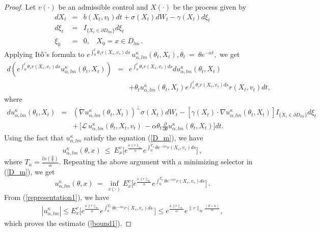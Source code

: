 \documentclass[11pt]{amsart}
\numberwithin{equation}{section}
\begin{document}
\begin{proof}
Let  $v(\cdot)$ be an admissible control and  $X(\cdot)$ be the process given by
 \[
 \begin{array}{rcl}
 \displaystyle{
  dX_t} &=& \displaystyle{ b(X_t,v_t)dt+\sigma(X_t) dW_t - \gamma(X_t)d\xi_t } \\
 \displaystyle{ d\xi_t }&=&  \displaystyle{  I_{\{X_t\in \partial D_{lm}\}} d\xi_t  } \\
 \displaystyle{ \xi_0 } &=& \displaystyle{  0,\ \ \ \ X_0 = x\in \overline{D}_{lm}\, . } 
 \end{array}
 \]
  Applying It$\hat{{\rm o}}$'s formula to $\displaystyle {
 e^{\int_{0}^{t} \theta_s r(X_s,v_s) ds} \, u^{\kappa}_{\alpha,lm}(\theta_t , X_t) }, \theta_t \ = \ 
 \theta e^{-\alpha t},$ we get
 \begin{eqnarray*}
  d\left( e^{\int_{0}^{t} \theta_s r(X_s,v_s) ds} u^{\kappa}_{\alpha,lm}(\theta_t , X_t)\right) &=& 
  e^{\int_{0}^{t} \theta_s r(X_s,v_s) ds} du^{\kappa}_{\alpha,lm}(\theta_t , X_t) \\
 &&+  \theta_t u^{\kappa}_{\alpha,lm}(\theta_t , X_t) e^{\int_{0}^{t} \theta_s r(X_s,v_s) ds} r(X_t,v_t) dt,
 \end{eqnarray*}
 where
 \begin{eqnarray*}
 du^{\kappa}_{\alpha,lm}(\theta_t , X_t) &=&  (\nabla u^{\kappa}_{\alpha,lm}(\theta_t, X_t))^\bot 
 \sigma(X_t) dW_t - \left[\gamma(X_t)\cdot \nabla u^{\kappa}_{\alpha,lm}
 (\theta_t, X_t)\right] I_{\{X_t\in\partial D_{lm}\}} d\xi_t \\ 
 && + \,  \Big[ {\mathcal L} \, u^{\kappa}_{\alpha, lm} (\theta_t, X_t, v_t) \, 
 - \alpha \theta_t \frac{\partial}{\partial \theta} u^{\kappa}_{\alpha,lm}(\theta_t , X_t) \Big] dt .
 \end{eqnarray*}
 Using the fact that $u^{\kappa}_{\alpha,lm}$ satisfy the equation (\ref{D_m}), we have 
 \[
  u^{\kappa}_{\alpha,lm}(\theta, x) \ \leq \ 
 E_x^v\Big[ e^{\frac{\kappa \|r\|_{\infty}}{\alpha}}
 e^{\int_{0}^{T_{\kappa}} \theta e^{-\alpha s} r(X_s,v_s) ds}\Big] \, , 
 \]
 where $\displaystyle{ T_{\kappa}=\frac{ln(\frac{\theta}{\kappa})}{\alpha} }$. 
 Repeating the above argument with a minimizing selector in (\ref{D_m}), we get 
 \begin{equation}\label{representation1}
  u^{\kappa}_{\alpha,lm}(\theta, x) \ = \ \inf_{v(\cdot)} 
 E_x^v\Big[ e^{\frac{\kappa \|r\|_{\infty}}{\alpha}}
 e^{\int_{0}^{T_{\kappa}} \theta e^{-\alpha s} r(X_s,v_s) ds}\Big] \,.
 \end{equation}
 From (\ref{representation1}), we have
 \begin{eqnarray*}
  |u^{\kappa}_{\alpha,lm}| \leq E_x^v\Big[ e^{\frac{\kappa \|r\|_{\infty}}{\alpha}}
 e^{\int_{0}^{T_{\kappa}} \theta e^{-\alpha s} r(X_s,v_s) ds} \,  \Big] 
 \leq  e^{\frac{\kappa \|r\|_{\infty}}{\alpha}} e^{\|r\|_{\infty} \frac{(\theta -\kappa)}{\alpha} },
 \end{eqnarray*}
 which proves the estimate (\ref{bound1}). 


\end{proof}
\end{document}
